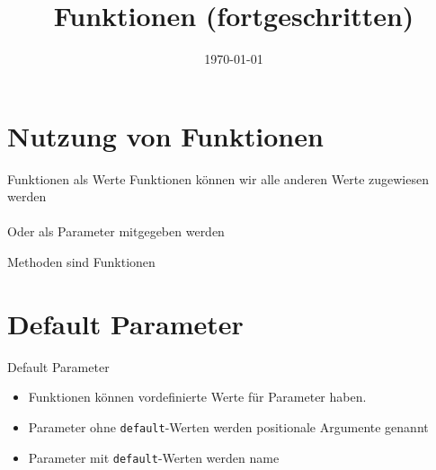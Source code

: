 

\newcommand{\topic}{
	Funktionen (fortgeschritten)
}

\title{\topic}
\supertitle{\course}
\date{\today}



\maketitle

\begin{frame}
	\tableofcontents
\end{frame}


\section{Nutzung von Funktionen}
\begin{frame}[fragile]{Funktionen als Werte}
Funktionen k\"onnen wir alle anderen Werte zugewiesen werden\\


\ \\[.25cm]
Oder als Parameter mitgegeben werden\\


\end{frame}

\begin{frame}[fragile]{Methoden sind Funktionen}

\end{frame}

\section{Default Parameter}
\begin{frame}[fragile]{Default Parameter}
\begin{itemize}
	\item Funktionen k\"onnen vordefinierte Werte für Parameter haben.
	\item Parameter ohne \texttt{default}-Werten werden positionale Argumente genannt
	\item Parameter mit \texttt{default}-Werten werden name
\end{itemize}

\end{frame}

